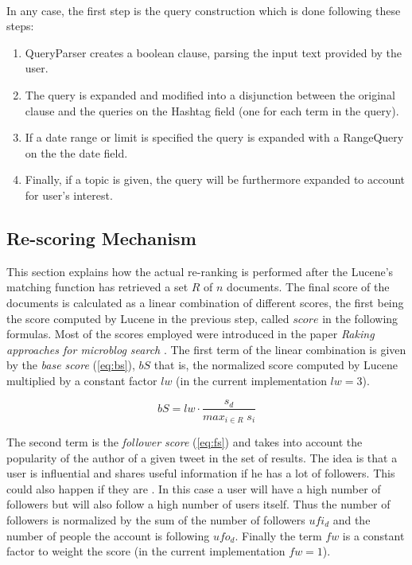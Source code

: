 \\[0.8em]
In any case, the first step is the query construction which is done following these steps:
\begin{enumerate}
    \item QueryParser creates a boolean clause, parsing the input text provided by the user.
    \item The query is expanded and modified into a disjunction between the original clause and the queries on the Hashtag field (one for each term in the query).
    \item If a date range or limit is specified the query is expanded with a RangeQuery on the the date field.
    \item Finally, if a topic is given, the query will be furthermore expanded to account for user's interest.
\end{enumerate}

\subsection{Re-scoring Mechanism}\label{subsec:rescoring-mechanism}

This section explains how the actual re-ranking is performed after the Lucene's matching function has retrieved a set $R$ of $n$ documents.
The final score of the documents is calculated as a linear combination of different scores, the first being the score computed by Lucene in the previous step, called $score$ in the following formulas. Most of the scores employed were introduced in the paper \textit{Raking approaches for microblog search} \autocite{nagmoti2010ranking}.
The first term of the linear combination is given by the \textit{base score} (\ref{eq:bs}), $bS$ that is, the normalized score computed by Lucene multiplied by a constant factor $lw$ (in the current implementation $lw = 3$).

\begin{equation}\label{eq:bs}
    bS = lw \cdot \frac{s_d}{max_{i \in R}{\; s_i}}
\end{equation}

The second term is the \textit{follower score} (\ref{eq:fs}) and takes into account the popularity of the author of a given tweet in the set of results. The idea is that a user is influential and shares useful information if he has a lot of followers. This could also happen if they are . In this case a user will have a high number of followers but will also follow a high number of users itself. Thus the number of followers is normalized by the sum of the number of followers $ufi_d$ and the number of people the account is following $ufo_d$. Finally the term $fw$ is a constant factor to weight the score (in the current implementation $fw = 1$).

